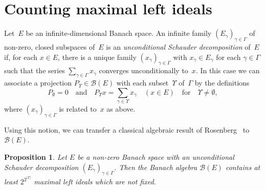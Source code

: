 \documentclass[12pt]{amsart}
\newtheorem{proposition}[theorem]{Proposition}
\theoremstyle{definition}
\numberwithin{equation}{section}
\begin{document}
\section{Counting maximal left ideals}\label{section_countingmaxideals}
\noindent
Let~$E$ be an infinite-dimensional Banach space. An infinite family
$(E_\gamma)_{\gamma\in\Gamma}$ of non-zero, closed subspaces of~$E$ is
an \emph{unconditional Schauder decomposition} of~$E$ if, for each
$x\in E$, there is a unique family $(x_\gamma)_{\gamma\in\Gamma}$ with
$x_\gamma\in E_\gamma$ for each $\gamma\in\Gamma$ such that the series
$\sum_{\gamma\in\Gamma}x_\gamma$ converges unconditionally to~$x$.  In
this case we can associate a projection $P_\Upsilon\in\mathscr{B}(E)$
with each subset~$\Upsilon$ of~$\Gamma$ by the definitions
\begin{equation}\label{defnprojPA}
P_\emptyset = 0\quad \text{and}\quad P_\Upsilon x = \sum_{\gamma\in
  \Upsilon}x_\gamma\quad (x\in E)\quad \text{for}\quad
\Upsilon\neq\emptyset, \end{equation}
 where $(x_\gamma)_{\gamma\in\Gamma}$ is related to~$x$ as above.

Using this notion, we can transfer a classical algebraic result of
Rosenberg~\cite{Rosenberg} to~$\mathscr{B}(E)$. 

\begin{proposition}\label{countingleftideals} Let $E$ be a non-zero Banach space
  with an unconditional Schauder decomposition
  $(E_\gamma)_{\gamma\in\Gamma}$. Then the Banach algebra
  $\mathscr{B}(E)$ contains at least $2^{2^{|\Gamma|}}$ maximal left
   ideals which are not fixed.
\end{proposition}
\end{document}
